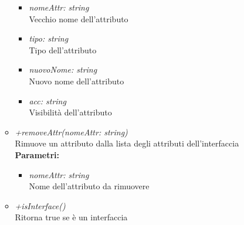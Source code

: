\begin{itemize}
\begin{itemize}
    		\begin{itemize}
    			\item \emph{nomeAttr: string}\\
    			Vecchio nome dell'attributo
    			\item \emph{tipo: string}\\
    			Tipo dell'attributo
    			\item \emph{nuovoNome: string}\\
    			Nuovo nome dell'attributo
    			\item \emph{acc: string}\\
    			Visibilità dell'attributo
    		\end{itemize}
    		\item \emph{+removeAttr(nomeAttr: string)}\\
    		Rimuove un attributo dalla lista degli attributi dell'interfaccia\\
    		\textbf{Parametri:}
    		\begin{itemize}
    			\item \emph{nomeAttr: string}\\
    			Nome dell'attributo da rimuovere
    		\end{itemize}
    		\item \emph{+isInterface()}\\
    		Ritorna true se è un interfaccia
    	\end{itemize}
\end{itemize}